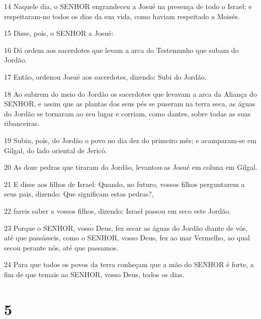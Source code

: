 \par 14 Naquele dia, o SENHOR engrandeceu a Josué na presença de todo o Israel; e respeitaram-no todos os dias da sua vida, como haviam respeitado a Moisés.
\par 15 Disse, pois, o SENHOR a Josué:
\par 16 Dá ordem aos sacerdotes que levam a arca do Testemunho que subam do Jordão.
\par 17 Então, ordenou Josué aos sacerdotes, dizendo: Subi do Jordão.
\par 18 Ao subirem do meio do Jordão os sacerdotes que levavam a arca da Aliança do SENHOR, e assim que as plantas dos seus pés se puseram na terra seca, as águas do Jordão se tornaram ao seu lugar e corriam, como dantes, sobre todas as suas ribanceiras.
\par 19 Subiu, pois, do Jordão o povo no dia dez do primeiro mês; e acamparam-se em Gilgal, do lado oriental de Jericó.
\par 20 As doze pedras que tiraram do Jordão, levantou-as Josué em coluna em Gilgal.
\par 21 E disse aos filhos de Israel: Quando, no futuro, vossos filhos perguntarem a seus pais, dizendo: Que significam estas pedras?,
\par 22 fareis saber a vossos filhos, dizendo: Israel passou em seco este Jordão.
\par 23 Porque o SENHOR, vosso Deus, fez secar as águas do Jordão diante de vós, até que passásseis, como o SENHOR, vosso Deus, fez ao mar Vermelho, ao qual secou perante nós, até que passamos.
\par 24 Para que todos os povos da terra conheçam que a mão do SENHOR é forte, a fim de que temais ao SENHOR, vosso Deus, todos os dias.

\chapter{5}


